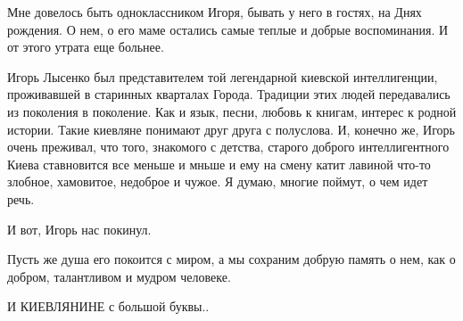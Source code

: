 Мне довелось быть одноклассником Игоря, бывать у него в гостях, на Днях
рождения. О нем, о его маме остались самые теплые и добрые воспоминания. И от
этого утрата еще больнее.

Игорь Лысенко был представителем той легендарной киевской интеллигенции,
проживавшей в старинных кварталах Города. Традиции этих людей передавались из
поколения в поколение. Как и язык, песни, любовь к книгам, интерес к родной
истории. Такие киевляне понимают друг друга с полуслова. И, конечно же, Игорь
очень преживал, что того, знакомого с детства, старого доброго интеллигентного
Киева ставновится все меньше и мньше и ему на смену катит лавиной что-то
злобное, хамовитое, недоброе и чужое. Я думаю, многие поймут, о чем идет речь.


И вот, Игорь нас покинул.

Пусть же душа его покоится с миром, а мы сохраним добрую память о нем, как о
добром, талантливом и мудром человеке.

И КИЕВЛЯНИНЕ с большой буквы..

